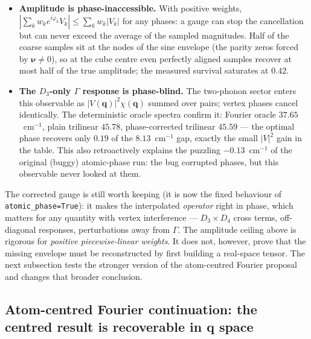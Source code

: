 \documentclass[11pt,a4paper]{article}
\newcommand{\qv}{\mathbf{q}}
\begin{document}
\begin{itemize}
\item \textbf{Amplitude is phase-inaccessible.}  With positive
  weights, $|\sum_k w_k e^{i\varphi_k}V_k|\le\sum_k w_k|V_k|$ for any
  phases: a gauge can stop the cancellation but can never exceed the
  average of the sampled magnitudes.  Half of the coarse samples sit
  at the nodes of the sine envelope (the parity zeros forced by
  $\boldsymbol\nu\neq0$), so at the cube centre even perfectly aligned
  samples recover at most half of the true amplitude; the measured
  survival saturates at $0.42$.
\item \textbf{The $D_3$-only $\Gamma$ response is phase-blind.}  The
  two-phonon sector enters this observable as $|V(\qv)|^2\chi(\qv)$
  summed over pairs; vertex phases cancel identically.  The
  deterministic oracle spectra confirm it: Fourier oracle
  $37.65$~cm$^{-1}$, plain trilinear $45.78$, phase-corrected
  trilinear $\mathbf{45.59}$ --- the optimal phase recovers only
  $0.19$ of the $8.13$~cm$^{-1}$ gap, exactly the small $|V|^2$ gain
  in the table.  This also retroactively explains the puzzling
  $-0.13$~cm$^{-1}$ of the original (buggy) atomic-phase run: the bug
  corrupted phases, but this observable never looked at them.
\end{itemize}

The corrected gauge is still worth keeping (it is now the fixed
behaviour of \texttt{atomic\_phase=True}): it makes the interpolated
\emph{operator} right in phase, which matters for any quantity with
vertex interference --- $D_3\times D_4$ cross terms, off-diagonal
responses, perturbations away from $\Gamma$.  The amplitude ceiling above
is rigorous for \emph{positive piecewise-linear weights}.  It does not,
however, prove that the missing envelope must be reconstructed by first
building a real-space tensor.  The next subsection tests the stronger
version of the atom-centred Fourier proposal and changes that broader
conclusion.

\subsection{Atom-centred Fourier continuation: the centred result is
recoverable in q space}
\label{sec:atom-fourier}
\end{document}
